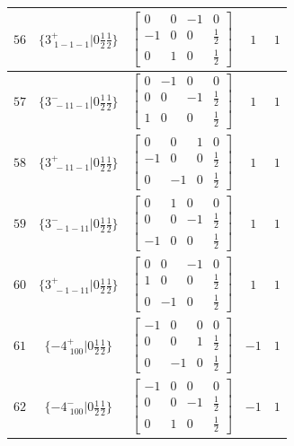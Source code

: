 \documentclass[fleqn,8pt]{jsarticle}
\begin{document}
\begin{longtable}{ccccc}
$ 56 $ & $ \{3^{+}_{\,\,1-1-1}|0 \frac{1}{2} \frac{1}{2}\} $ & $ \begin{bmatrix} 0 & 0 & -1 & 0 \\ -1 & 0 & 0 & \frac{1}{2} \\ 0 & 1 & 0 & \frac{1}{2} \end{bmatrix} $ & $ 1 $ & $ 1 $ \\ \hline
$ 57 $ & $ \{3^{-}_{\,\,-11-1}|0 \frac{1}{2} \frac{1}{2}\} $ & $ \begin{bmatrix} 0 & -1 & 0 & 0 \\ 0 & 0 & -1 & \frac{1}{2} \\ 1 & 0 & 0 & \frac{1}{2} \end{bmatrix} $ & $ 1 $ & $ 1 $ \\ \hline
$ 58 $ & $ \{3^{+}_{\,\,-11-1}|0 \frac{1}{2} \frac{1}{2}\} $ & $ \begin{bmatrix} 0 & 0 & 1 & 0 \\ -1 & 0 & 0 & \frac{1}{2} \\ 0 & -1 & 0 & \frac{1}{2} \end{bmatrix} $ & $ 1 $ & $ 1 $ \\ \hline
$ 59 $ & $ \{3^{-}_{\,\,-1-11}|0 \frac{1}{2} \frac{1}{2}\} $ & $ \begin{bmatrix} 0 & 1 & 0 & 0 \\ 0 & 0 & -1 & \frac{1}{2} \\ -1 & 0 & 0 & \frac{1}{2} \end{bmatrix} $ & $ 1 $ & $ 1 $ \\ \hline
$ 60 $ & $ \{3^{+}_{\,\,-1-11}|0 \frac{1}{2} \frac{1}{2}\} $ & $ \begin{bmatrix} 0 & 0 & -1 & 0 \\ 1 & 0 & 0 & \frac{1}{2} \\ 0 & -1 & 0 & \frac{1}{2} \end{bmatrix} $ & $ 1 $ & $ 1 $ \\ \hline
$ 61 $ & $ \{-4^{+}_{\,\,100}|0 \frac{1}{2} \frac{1}{2}\} $ & $ \begin{bmatrix} -1 & 0 & 0 & 0 \\ 0 & 0 & 1 & \frac{1}{2} \\ 0 & -1 & 0 & \frac{1}{2} \end{bmatrix} $ & $ -1 $ & $ 1 $ \\ \hline
$ 62 $ & $ \{-4^{-}_{\,\,100}|0 \frac{1}{2} \frac{1}{2}\} $ & $ \begin{bmatrix} -1 & 0 & 0 & 0 \\ 0 & 0 & -1 & \frac{1}{2} \\ 0 & 1 & 0 & \frac{1}{2} \end{bmatrix} $ & $ -1 $ & $ 1 $ \\ \hline

\end{longtable}
\end{document}
